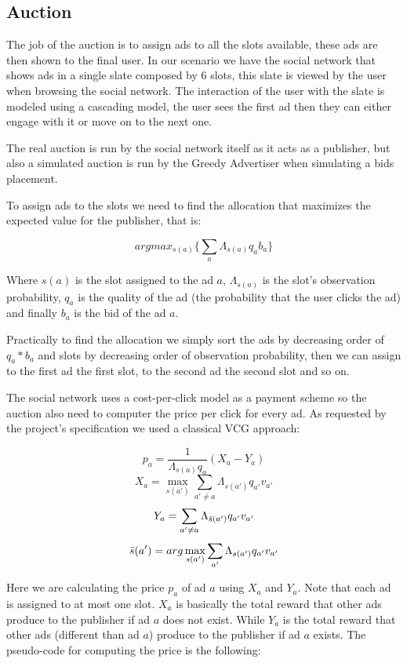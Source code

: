 \documentclass{article}
\begin{document}
\subsection{Auction}\label{subchap:Auction}
The job of the auction is to assign ads to all the slots available, these ads are then shown to the final user. In our scenario we have the social network that shows ads in a single slate composed by 6 slots, this slate is viewed by the user when browsing the social network.
The interaction of the user with the slate is modeled using a cascading model, the user sees the first ad then they can either engage with it or move on to the next one.

The real auction is run by the social network itself as it acts as a publisher, but also a simulated auction is run by the Greedy Advertiser when simulating a bids placement.

To assign ads to the slots we need to find the allocation that maximizes the expected value for the publisher, that is:

\[argmax_{s(a)} \{\sum_{a}\Lambda_{s(a)}{q_a}{b_a}\}\]

Where $s(a)$ is the slot assigned to the ad $a$, $\Lambda_{s(a)}$ is the slot's observation probability, $q_a$ is the quality of the ad (the probability that the user clicks the ad) and finally $b_a$ is the bid of the ad $a$.

Practically to find the allocation we simply sort the ads by decreasing order of $q_a*b_a$ and slots by decreasing order of observation probability, then we can assign to the first ad the first slot, to the second ad the second slot and so on.

The social network uses a cost-per-click model as a payment scheme so the auction also need to computer the price per click for every ad. As requested by the project's specification we used a classical VCG approach:

\[ p_a = \frac{1}{\Lambda_{s(a)}q_a}(X_a - Y_a) \]
\[ X_a = \max_{s(a')} \sum_{a'\neq a} \Lambda_{s(a')}q_{a'}v_{a'} \]
\[ Y_a = \sum_{a' \neq a} \Lambda_{\Bar{s}(a')}q_{a'}v_{a'} \]
\[ \Bar{s}(a') = arg\max_{s(a')} \sum_{a'} \Lambda_{s(a')}q_{a'}v_{a'} \]

Here we are calculating the price $p_a$ of ad $a$ using $X_a$ and $Y_a$. Note that each ad is assigned to at most one slot. $X_a$ is basically the total reward that other ads produce to the publisher if ad $a$ does not exist. While $Y_a$ is the total reward that other ads (different than ad $a$) produce to the publisher if ad $a$ exists. 
The pseudo-code for computing the price is the following:
\end{document}
